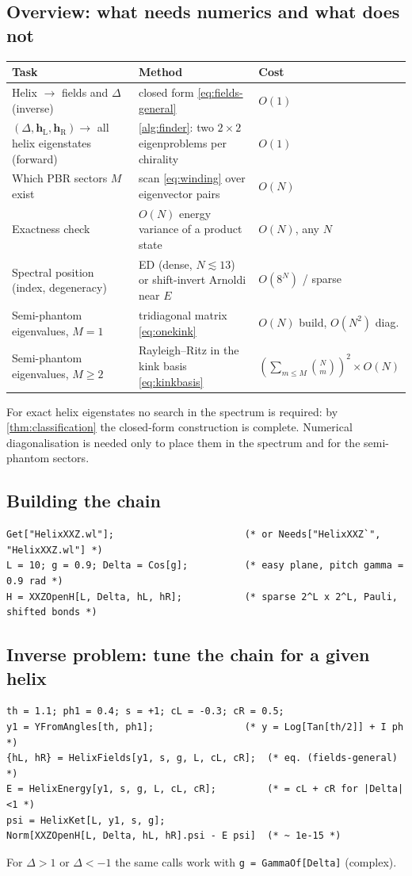 \documentclass[11pt,a4paper]{article}
\theoremstyle{definition}
\newcommand{\hL}{\mathbf h_{\mathrm L}}
\newcommand{\hR}{\mathbf h_{\mathrm R}}
\begin{document}
\subsection{Overview: what needs numerics and what does not}
\begin{center}
\begin{tabular}{p{5.2cm}p{4.6cm}p{4.6cm}}
\toprule
Task & Method & Cost\\ \midrule
Helix $\to$ fields and $\Delta$ (inverse) & closed form \eqref{eq:fields-general} & $O(1)$\\
$(\Delta,\hL,\hR)\to$ all helix eigenstates (forward) & \cref{alg:finder}: two $2\times2$ eigenproblems per chirality & $O(1)$\\
Which PBR sectors $M$ exist & scan \eqref{eq:winding} over eigenvector pairs & $O(N)$\\
Exactness check & $O(N)$ energy variance of a product state & $O(N)$, any $N$\\
Spectral position (index, degeneracy) & ED (dense, $N\lesssim13$) or shift-invert Arnoldi near $E$ & $O(8^N)$ / sparse\\
Semi-phantom eigenvalues, $M=1$ & tridiagonal matrix \eqref{eq:onekink} & $O(N)$ build, $O(N^2)$ diag.\\
Semi-phantom eigenvalues, $M\ge2$ & Rayleigh--Ritz in the kink basis \eqref{eq:kinkbasis} & $(\sum_{m\le M}\binom Nm)^2\times O(N)$\\ \bottomrule
\end{tabular}
\end{center}
For exact helix eigenstates no search in the spectrum is required: by \cref{thm:classification} the closed-form construction is complete. Numerical diagonalisation is needed only to place them in the spectrum and for the semi-phantom sectors.

\subsection{Building the chain}
\begin{lstlisting}
Get["HelixXXZ.wl"];                       (* or Needs["HelixXXZ`", "HelixXXZ.wl"] *)
L = 10; g = 0.9; Delta = Cos[g];          (* easy plane, pitch gamma = 0.9 rad *)
H = XXZOpenH[L, Delta, hL, hR];           (* sparse 2^L x 2^L, Pauli, shifted bonds *)
\end{lstlisting}

\subsection{Inverse problem: tune the chain for a given helix}
\begin{lstlisting}
th = 1.1; ph1 = 0.4; s = +1; cL = -0.3; cR = 0.5;
y1 = YFromAngles[th, ph1];                (* y = Log[Tan[th/2]] + I ph *)
{hL, hR} = HelixFields[y1, s, g, L, cL, cR];  (* eq. (fields-general) *)
E = HelixEnergy[y1, s, g, L, cL, cR];         (* = cL + cR for |Delta|<1 *)
psi = HelixKet[L, y1, s, g];
Norm[XXZOpenH[L, Delta, hL, hR].psi - E psi]  (* ~ 1e-15 *)
\end{lstlisting}
For $\Delta>1$ or $\Delta<-1$ the same calls work with \texttt{g = GammaOf[Delta]} (complex).
\end{document}
